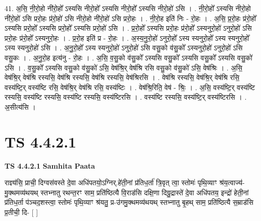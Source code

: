 \documentclass[17pt]{extarticle}
\begin{document}
41. अ॒सि॒ नी॒रो॒हो नी॑रो॒हो᳚ ऽस्यसि नीरो॒हो᳚ ऽस्यसि नीरो॒हो᳚ ऽस्यसि नीरो॒हो॑ ऽसि । . नी॒रो॒हो᳚ ऽस्यसि नीरो॒हो नी॑रो॒हो॑ ऽसि प्ररो॒हः प्र॑रो॒हो॑ ऽसि नीरो॒हो नी॑रो॒हो॑ ऽसि प्ररो॒हः । . नी॒रो॒ह इति॑ निः - रो॒हः । . अ॒सि॒ प्र॒रो॒हः प्र॑रो॒हो᳚ ऽस्यसि प्ररो॒हो᳚ ऽस्यसि प्ररो॒हो᳚ ऽस्यसि प्ररो॒हो॑ ऽसि । . प्र॒रो॒हो᳚ ऽस्यसि प्ररो॒हः प्र॑रो॒हो᳚ ऽस्यनुरो॒हो॑ ऽनुरो॒हो॑ ऽसि प्ररो॒हः प्र॑रो॒हो᳚ ऽस्यनुरो॒हः । . प्र॒रो॒ह इति॑ प्र - रो॒हः । . अ॒स्य॒नु॒रो॒हो॑ ऽनुरो॒हो᳚ ऽस्य स्यनुरो॒हो᳚ ऽस्य स्यनुरो॒हो᳚ ऽस्य स्यनुरो॒हो॑ ऽसि । . अ॒नु॒रो॒हो᳚ ऽस्य स्यनुरो॒हो॑ ऽनुरो॒हो॑ ऽसि वसु॒को व॑सु॒को᳚ ऽस्यनुरो॒हो॑ ऽनुरो॒हो॑ ऽसि वसु॒कः । . अ॒नु॒रो॒ह इत्य॑नु - रो॒हः । . अ॒सि॒ व॒सु॒को व॑सु॒को᳚ ऽस्यसि वसु॒को᳚ ऽस्यसि वसु॒को᳚ ऽस्यसि वसु॒को॑ ऽसि । . व॒सु॒को᳚ ऽस्यसि वसु॒को व॑सु॒को॑ ऽसि॒ वेष॑श्रि॒र् वेष॑श्रि रसि वसु॒को व॑सु॒को॑ ऽसि॒ वेष॑श्रिः । . अ॒सि॒ वेष॑श्रि॒र् वेष॑श्रि रस्यसि॒ वेष॑श्रि रस्यसि॒ वेष॑श्रि रस्यसि॒ वेष॑श्रिरसि । . वेष॑श्रि रस्यसि॒ वेष॑श्रि॒र् वेष॑श्रि रसि॒ वस्य॑ष्टि॒र् वस्य॑ष्टि रसि॒ वेष॑श्रि॒र् वेष॑श्रि रसि॒ वस्य॑ष्टिः । . वेष॑श्रि॒रिति॒ वेष॑ - श्रिः॒ । . अ॒सि॒ वस्य॑ष्टि॒र् वस्य॑ष्टि रस्यसि॒ वस्य॑ष्टि रस्यसि॒ वस्य॑ष्टि रस्यसि॒ वस्य॑ष्टिरसि । . वस्य॑ष्टि रस्यसि॒ वस्य॑ष्टि॒र् वस्य॑ष्टिरसि । . अ॒सीत्य॑सि । \newline
\pagebreak
{}

\section{ TS 4.4.2.1 }

\textbf{TS 4.4.2.1 } \newline
\textbf{Samhita Paata} \newline

राज्ञ्य॑सि॒ प्राची॒ दिग्वस॑वस्ते दे॒वा अधि॑पतयो॒ऽग्निर्.हे॑ती॒नां प्र॑तिध॒र्ता॑ त्रि॒वृत् त्वा॒ स्तोमः॑ पृथि॒व्याꣳ श्र॑य॒त्वाज्य॑-मु॒क्थमव्य॑थयथ् स्तभ्नातु रथन्त॒रꣳ साम॒ प्रति॑ष्ठित्यै वि॒राड॑सि दक्षि॒णा दिग्रु॒द्रास्ते॑ दे॒वा अधि॑पतय॒ इन्द्रो॑ हेती॒नां प्र॑तिध॒र्ता प॑ञ्चद॒शस्त्वा॒ स्तोमः॑ पृथि॒व्याꣳ श्र॑यतु॒ प्र-उ॑गमु॒क्थमव्य॑थयथ् स्तभ्नातु बृ॒हथ् साम॒ प्रति॑ष्ठित्यै स॒म्राड॑सि प्र॒तीची॒ दि- [  ] \newline
\end{document}
